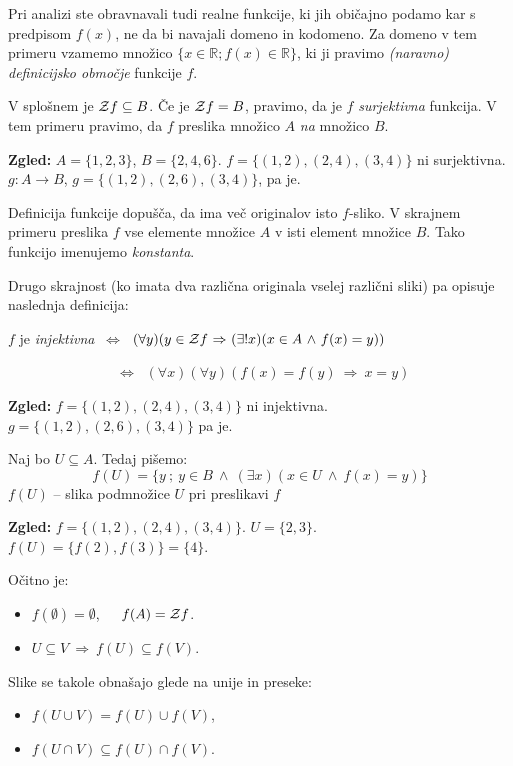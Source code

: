 \documentclass[11pt,paper=b5,footinclude,headinclude]{scrbook} %
\def\inn {{~\wedge~}}
\def\sledi {{~\Rightarrow~}}
\def\cee {{~\Leftrightarrow~}}
\begin{document}
\bigskip
Pri analizi ste obravnavali tudi realne funkcije, ki jih običajno podamo kar s predpisom $f(x)$, ne da bi navajali domeno in kodomeno.
Za domeno v tem primeru vzamemo množico $\{x\in \mathbb{R}; f(x)\in \mathbb{R}\}$, ki ji
pravimo \emph{ (naravno) definicijsko območje} funkcije $f$.

\bigskip
V splošnem je ${\cal Z}f \subseteq B$. Če je ${\cal Z}f  = B$, pravimo, da je  $f$ {\em surjektivna} funkcija.
V tem primeru pravimo, da $f$ preslika množico $A$ {\em na} množico $B$.

\bigskip
\textbf{ Zgled:} $A = \{1,2,3\}$, $B = \{2,4,6\}$. $f= \{(1,2),(2,4),(3,4)\}$ ni surjektivna. $g:A\to B$, $g = \{(1,2),(2,6),(3,4)\}$, pa je.

\bigskip
Definicija funkcije dopušča, da ima več originalov isto $f$-sliko. V skrajnem primeru preslika $f$ vse elemente množice $A$ v isti element množice $B$. Tako funkcijo imenujemo {\em konstanta}.

Drugo skrajnost (ko imata dva različna originala vselej različni sliki) pa opisuje
naslednja definicija:

$f$ je {\em injektivna} $\cee$ $(\forall y)(y\in {\cal Z}f\sledi (\exists!x)(x\in A \inn f(x) = y))$

~~~~~~~~~~~~~~~$\cee$ $(\forall x)(\forall y)(f(x) = f(y) \sledi x = y)$

\bigskip
\textbf{ Zgled:} $f = \{(1,2),(2,4),(3,4)\}$ ni injektivna.
$g = \{(1,2),(2,6),(3,4)\}$ pa je.

\bigskip
Naj bo $U\subseteq A$. Tedaj pišemo:
$$f(U) = \{y~;~y\in B\inn (\exists x)(x\in U\inn f(x) = y)\}$$
$f(U)$ -- slika podmnožice $U$ pri preslikavi $f$

\bigskip
\textbf{ Zgled:} $f = \{(1,2),(2,4),(3,4)\}$.
$U = \{2,3\}$. $f(U) = \{f(2),f(3)\} = \{4\}$.

\medskip
Očitno je:
\begin{itemize}
  \item $f(\emptyset) = \emptyset$,~~~$f(A) = {\cal Z}f$.
  \item $U\subseteq V\sledi f(U)\subseteq f(V)$.
\end{itemize}

Slike se takole obnašajo glede na unije in preseke:
\begin{itemize}
  \item $f(U\cup V) = f(U)\cup f(V)$,
  \item $f(U\cap V) \subseteq f(U)\cap f(V)$.
\end{itemize}
\end{document}

